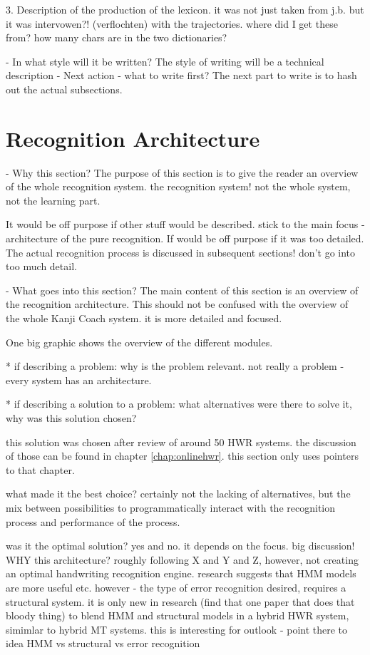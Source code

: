   3. Description of the production of the lexicon.
     it was not just taken from j.b. but it was intervowen?! (verflochten) 
     with the trajectories. where did I get these from? 
     how many chars are in the two dictionaries?

- In what style will it be written?
  The style of writing will be a technical description
- Next action - what to write first?
  The next part to write is to hash out the actual subsections.

\section{Recognition Architecture}
\label{sec:hwre:recognitionarchitecture}

- Why this section? 
  The purpose of this section is to give the reader an overview of the whole
  recognition system. the recognition system! not the whole system, 
  not the learning part.

  It would be off purpose if other stuff would be described.
  stick to the main focus - architecture of the pure recognition.
  If would be off purpose if it was too detailed.
  The actual recognition process is discussed in subsequent sections!
  don't go into too much detail.

- What goes into this section?
  The main content of this section is an overview of the recognition 
  architecture. This should not be confused with the overview of the
  whole Kanji Coach system. it is more detailed and focused.

  One big graphic shows the overview of the different modules.
  
  * if describing a problem: why is the problem relevant.
    not really a problem - every system has an architecture.
   

  * if describing a solution to a problem: what alternatives were
    there to solve it, why was this solution chosen? 

    this solution was chosen after review of around 50 HWR systems.
    the discussion of those can be found in chapter \ref{chap:onlinehwr}.
    this section only uses pointers to that chapter.

    what made it the best choice?
    certainly not the lacking of alternatives, but the mix between 
    possibilities to programmatically interact with the recognition process
    and performance of the process.

    was it the optimal solution?
    yes and no.
    it depends on the focus.
    big discussion! WHY this architecture?
    roughly following X and Y and Z,
    however, not creating an optimal handwriting recognition engine.
    research suggests that HMM models are more useful etc.
    however - the type of error recognition desired,
    requires a structural system.
    it is only new in research (find that one paper 
    that does that bloody thing) to blend HMM and structural models
    in a hybrid HWR system, simimlar to hybrid MT systems.
    this is interesting for outlook - point there to idea
    HMM vs structural vs error recognition

